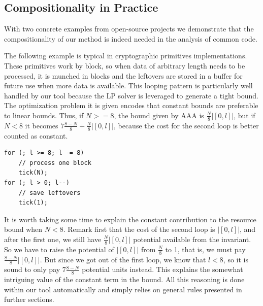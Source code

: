 \documentclass[nocopyrightspace,preprint,pldi]{sigplanconf-pldi15}
\begin{document}

\subsection{Compositionality in Practice}

With two concrete examples from open-source projects we demonstrate
that the compositionality of our method is indeed needed in the
analysis of common code.


The following example is typical in cryptographic primitives
implementations.  These primitives work by block, so when data of
arbitrary length needs to be processed, it is munched in blocks and
the leftovers are stored in a buffer for future use when more data
is available.  This looping pattern is particularly well handled by
our tool because the LP solver is leveraged to generate a tight bound.
The optimization problem it is given encodes that constant bounds are
preferable to linear bounds.  Thus, if $N >= 8$, the bound given by
AAA is $\frac{N}{8} |[0,l]|$, but if $N<8$ it becomes $7\frac{8-N}{8}
+ \frac{N}{8}|[0,l]|$, because the cost for the second loop is better
counted as constant.
%
%
\begin{lstlisting}
for (; l >= 8; l -= 8)
    // process one block
    tick(N);
for (; l > 0; l--)
    // save leftovers
    tick(1);
\end{lstlisting}
%
It is worth taking some time to explain the constant contribution
to the resource bound when $N<8$.  Remark first that the cost of
the second loop is $|[0,l]|$, and after the first one, we still have
$\frac{N}{8}|[0,l]|$ potential available from the invariant.  So we have
to raise the potential of $|[0,l]|$ from $\frac{N}{8}$ to 1, that is,
we must pay $\frac{8-N}{8}|[0,l]|$.  But since we got out of the first
loop, we know that $l<8$, so it is sound to only pay $7\frac{8-N}{8}$
potential units instead.  This explains the somewhat intriguing value
of the constant term in the bound.  All this reasoning is done within
our tool automatically and simply relies on general rules presented
in further sections.
\end{document}
